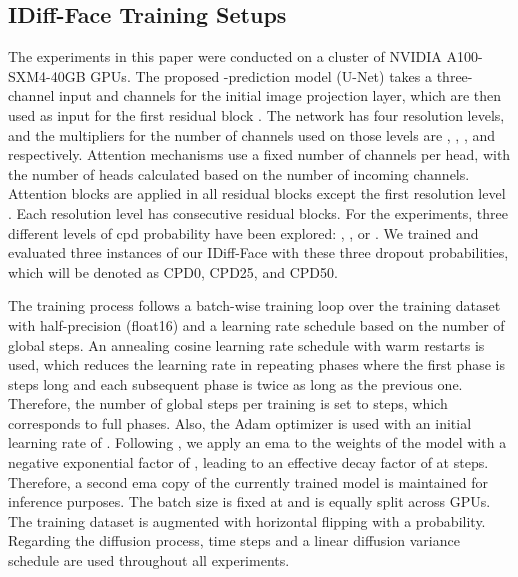 \documentclass[10pt,twocolumn,letterpaper]{article}
\newcommand{\cacpdzeroshortwithoutspace}{CPD0}
\newcommand{\cacpdtwentyfiveshortwithoutspace}{CPD25}
\newcommand{\cacpdfiftyshortwithoutspace}{CPD50}
\newcommand{\approachname}{IDiff-Face }
\begin{document}
\vspace{-2mm}
\subsection{\approachname Training Setups}
\vspace{-1mm}
The experiments in this paper were conducted on a cluster of  NVIDIA A100-SXM4-40GB GPUs. The proposed -prediction model (U-Net) \cite{Rombach2021} takes a three-channel input and  channels for the initial image projection layer, which are then used as input for the first residual block \cite{ResNet}. The network has four resolution levels, and the multipliers for the number of channels used on those levels are , , , and  respectively. Attention mechanisms use a fixed number of  channels per head, with the number of heads calculated based on the number of incoming channels. Attention blocks are applied in all residual blocks except the first resolution level \cite{Rombach2021}. Each resolution level has  consecutive residual blocks. For the experiments, three different levels of \acrshort{cpd} probability have been explored: , , or . We trained and evaluated three instances of our \approachname with these three dropout probabilities, which will be denoted as \cacpdzeroshortwithoutspace, \cacpdtwentyfiveshortwithoutspace, and \cacpdfiftyshortwithoutspace.

The training process follows a batch-wise training loop over the training dataset  with half-precision (float16) and a learning rate schedule based on the number of global steps. An annealing cosine learning rate schedule with warm restarts \cite{CosineAnnealing} is used, which reduces the learning rate in repeating phases where the first phase is  steps long and each subsequent phase is twice as long as the previous one. Therefore, the number of global steps per training is set to  steps, which corresponds to  full phases. Also, the Adam optimizer \cite{AdamOptimizer} is used with an initial learning rate of . Following \cite{Ho2020, Rombach2021}, we apply an \acrshort{ema} to the weights of the model with a negative exponential factor of , leading to an effective decay factor of  at  steps. Therefore, a second \acrshort{ema} copy of the currently trained model is maintained for inference purposes. The batch size is fixed at  and is equally split across  GPUs. 
The training dataset is augmented with horizontal flipping with a  probability.
Regarding the diffusion process,  time steps and a linear diffusion variance schedule are used throughout all experiments.
\end{document}
